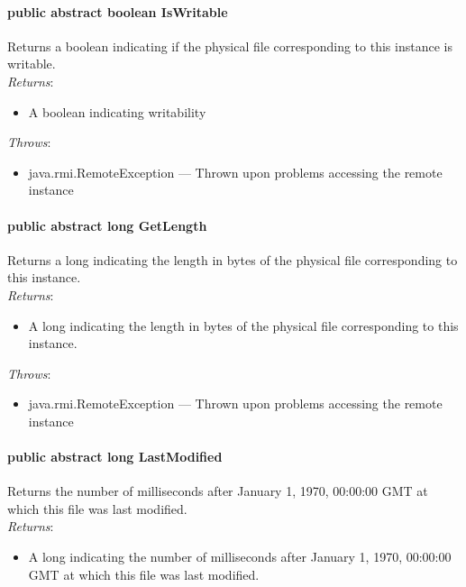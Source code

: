 \documentclass[$Date: 2003/06/26 19:29:31 $]{glabarticle}
\begin{document}
\paragraph{public abstract boolean IsWritable}

Returns a boolean indicating if the physical file corresponding to
this instance is writable.\\

\textit{Returns}:
\begin{itemize}
\item[] A boolean indicating writability
\end{itemize}

 \textit{Throws}:
 \begin{itemize}
 \item[] java.rmi.RemoteException --- Thrown upon problems accessing the remote instance 
 \end{itemize}
 
\paragraph{public abstract long GetLength}

Returns a long indicating the length in bytes of the physical file
corresponding to this instance.\\

\textit{Returns}:
\begin{itemize}
\item[] A long indicating the length in bytes of the physical file corresponding to this instance. 
\end{itemize}

 \textit{Throws}:
 \begin{itemize}
 \item[] java.rmi.RemoteException --- Thrown upon problems accessing the remote instance 
 \end{itemize}
 
\paragraph{public abstract long LastModified}

Returns the number of milliseconds after January 1, 1970, 00:00:00 GMT
at which this file was last modified.\\

\textit{Returns}:
\begin{itemize}
\item[] A long indicating the number of milliseconds after January 1, 1970, 00:00:00 GMT at which this file 
was last modified.
\end{itemize}
\end{document}
